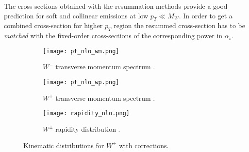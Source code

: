 	 The cross-sections obtained with the resummation methods provide a good prediction for soft and collinear emissions at low $p_T\ll M_W$. In order to get a combined cross-section for higher $p_T$ region the resummed cross-section has to be \textit{matched} with the fixed-order cross-sections of the corresponding power in $\alpha_s$. 
	 \begin{figure}[htbp]
	 	\begin{subfigure}[t]{0.31\textwidth} 
	 		\texttt{[image: pt\_nlo\_wm.png]}
	 		\caption[Transverse view]{$W^{-}$ transverse momentum spectrum \cite{Bizon:2019zgf}.}
	 		\label{fig::wm_pt}
	 	\end{subfigure}
	 	\begin{subfigure}[t]{0.31\textwidth}
	 		\texttt{[image: pt\_nlo\_wp.png]}
	 		\caption[Side view]{$W^{+}$ transverse momentum spectrum \cite{Bizon:2019zgf}.}
	 		\label{fig::wp_pt}
	 	\end{subfigure}
	 	\hfill
	 		\begin{subfigure}[t]{0.36\textwidth}
	 		\texttt{[image: rapidity\_nlo.png]}
	 		\caption[Side view]{$W^{\pm}$ rapidity distribution \cite{Anastasiou:2003ds}.}
	 		\label{fig::w_rapid}
	 	\end{subfigure}
	 	\caption{Kinematic distributions for $W^{\pm}$ with corrections.}
	 	\label{fig::w_kinematics}
	 \end{figure}
